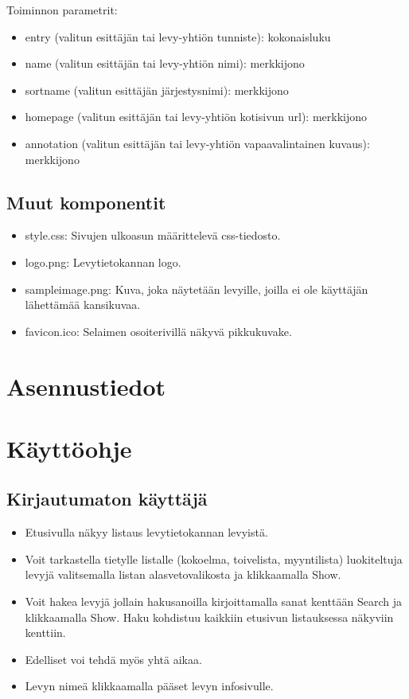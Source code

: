 \documentclass[a4paper,12pt]{report}
\begin{document}
Toiminnon parametrit:
\begin{itemize}
  \item entry (valitun esittäjän tai levy-yhtiön tunniste): kokonaisluku
  \item name (valitun esittäjän tai levy-yhtiön nimi): merkkijono
  \item sortname (valitun esittäjän järjestysnimi): merkkijono
  \item homepage (valitun esittäjän tai levy-yhtiön kotisivun url): merkkijono
  \item annotation (valitun esittäjän tai levy-yhtiön vapaavalintainen
    kuvaus): merkkijono
\end{itemize}

\subsection{Muut komponentit}

\begin{itemize}
  \item style.css: Sivujen ulkoasun määrittelevä css-tiedosto.
  \item logo.png: Levytietokannan logo.
  \item sampleimage.png: Kuva, joka näytetään levyille, joilla ei ole
    käyttäjän lähettämää kansikuvaa.
  \item favicon.ico: Selaimen osoiterivillä näkyvä pikkukuvake.
\end{itemize}

\section{Asennustiedot}

\section{Käyttöohje}

\subsection{Kirjautumaton käyttäjä}

\begin{itemize}
  \item Etusivulla näkyy listaus levytietokannan levyistä.
  \item Voit tarkastella tietylle listalle (kokoelma, toivelista,
    myyntilista) luokiteltuja levyjä valitsemalla listan alasvetovalikosta
    ja klikkaamalla Show.
  \item Voit hakea levyjä jollain hakusanoilla kirjoittamalla sanat kenttään
    Search ja klikkaamalla Show. Haku kohdistuu kaikkiin etusivun
    listauksessa näkyviin kenttiin.
  \item Edelliset voi tehdä myös yhtä aikaa.
  \item Levyn nimeä klikkaamalla pääset levyn infosivulle.
\end{itemize}
	
\end{document}
